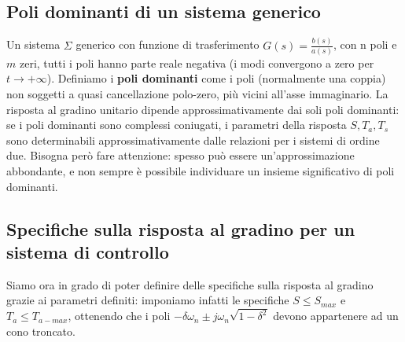 \documentclass[11pt]{article}
\begin{document}
\subsection{Poli dominanti di un sistema generico}
Un sistema $\Sigma$ generico con funzione di trasferimento $G(s)=\frac{b(s)}{a(s)}$, con n poli e $m$ zeri, tutti i poli hanno parte reale negativa (i modi convergono a zero per $t\rightarrow+\infty$). Definiamo i \textbf{poli dominanti} come i poli (normalmente una coppia) non soggetti a quasi cancellazione polo-zero, più vicini all'asse immaginario. La risposta al gradino unitario dipende approssimativamente dai soli poli dominanti: se i poli dominanti sono complessi coniugati, i parametri della risposta $S, T_a, T_s$ sono determinabili approssimativamente dalle relazioni per i sistemi di ordine due. Bisogna però fare attenzione: spesso può essere un'approssimazione abbondante, e non sempre è possibile individuare un insieme significativo di poli dominanti. 
\subsection{Specifiche sulla risposta al gradino per un sistema di controllo}
Siamo ora in grado di poter definire delle specifiche sulla risposta al gradino grazie ai parametri definiti: imponiamo infatti le specifiche $S \le S_{max}$ e $T_a \le T_{a-max}$, ottenendo che i poli $-\delta\omega_n \pm j\omega_n \sqrt{1-\delta^2}$ devono appartenere ad un cono troncato.
\end{document}
